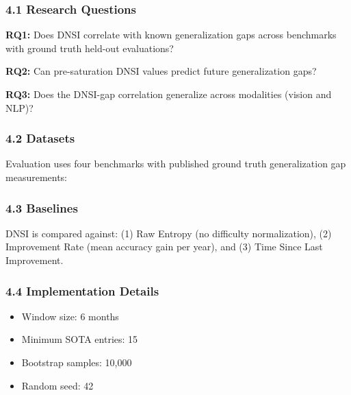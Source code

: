 
\subsubsection{4.1 Research Questions}

\textbf{RQ1:} Does DNSI correlate with known generalization gaps across benchmarks with ground truth held-out evaluations?

\textbf{RQ2:} Can pre-saturation DNSI values predict future generalization gaps?

\textbf{RQ3:} Does the DNSI-gap correlation generalize across modalities (vision and NLP)?

\subsubsection{4.2 Datasets}

Evaluation uses four benchmarks with published ground truth generalization gap measurements:

\begin{table}[htbp]
\centering
{}
\end{table}

\subsubsection{4.3 Baselines}

DNSI is compared against: (1) Raw Entropy (no difficulty normalization), (2) Improvement Rate (mean accuracy gain per year), and (3) Time Since Last Improvement.

\subsubsection{4.4 Implementation Details}

\begin{itemize}
\item Window size: 6 months
\item Minimum SOTA entries: 15
\item Bootstrap samples: 10,000
\item Random seed: 42
\end{itemize}

